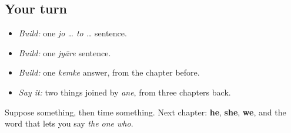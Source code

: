 \subsection*{Your turn}
\begin{itemize}
\raggedright
  \item \emph{Build:} one \emph{jo … to …} sentence.
  \item \emph{Build:} one \emph{jyāre} sentence.
  \item \emph{Build:} one \emph{kemke} answer, from the chapter before.
  \item \emph{Say it:} two things joined by \emph{ane}, from three chapters back.
\end{itemize}

\begin{tcolorbox}[breakable,colback=teal!4,colframe=teal!35!black,title={Before you move on}]
Suppose something, then time something. Next chapter: \textbf{he}, \textbf{she}, \textbf{we}, and the word that lets you say \emph{the one who}.
\end{tcolorbox}
